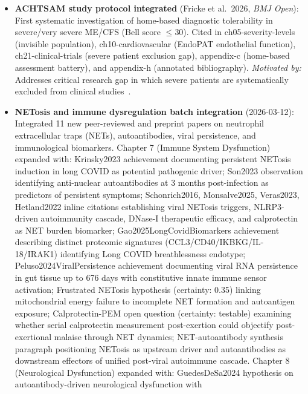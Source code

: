 \begin{itemize}

  \item \textbf{ACHTSAM study protocol integrated} (Fricke et al.\ 2026,
    \textit{BMJ Open}): First systematic investigation of home-based diagnostic
    tolerability in severe/very severe ME/CFS (Bell score $\leq$30). Cited in
    ch05-severity-levels (invisible population), ch10-cardiovascular (EndoPAT
    endothelial function), ch21-clinical-trials (severe patient exclusion gap),
    appendix-c (home-based assessment battery), and appendix-h (annotated
    bibliography).
    \textit{Motivated by:} Addresses critical research gap in which severe
    patients are systematically excluded from clinical
    studies~\cite{Fricke2026achtsam}.

  \item \textbf{NETosis and immune dysregulation batch integration} (2026-03-12):
    Integrated 11 new peer-reviewed and preprint papers on neutrophil extracellular
    traps (NETs), autoantibodies, viral persistence, and immunological biomarkers.
    Chapter 7 (Immune System Dysfunction) expanded with: Krinsky2023 achievement
    documenting persistent NETosis induction in long COVID as potential pathogenic
    driver; Son2023 observation identifying anti-nuclear autoantibodies at 3 months
    post-infection as predictors of persistent symptoms; Schonrich2016, Monsalve2025,
    Veras2023, Hetland2022 inline citations establishing viral NETosis triggers,
    NLRP3-driven autoimmunity cascade, DNase-I therapeutic efficacy, and calprotectin
    as NET burden biomarker; Gao2025LongCovidBiomarkers achievement describing
    distinct proteomic signatures (CCL3/CD40/IKBKG/IL-18/IRAK1) identifying Long COVID
    breathlessness endotype; Peluso2024ViralPersistence achievement documenting viral
    RNA persistence in gut tissue up to 676 days with constitutive innate immune
    sensor activation; Frustrated NETosis hypothesis (certainty: 0.35) linking
    mitochondrial energy failure to incomplete NET formation and autoantigen exposure;
    Calprotectin-PEM open question (certainty: testable) examining whether serial
    calprotectin measurement post-exertion could objectify post-exertional malaise
    through NET dynamics; NET-autoantibody synthesis paragraph positioning NETosis as
    upstream driver and autoantibodies as downstream effectors of unified post-viral
    autoimmune cascade. Chapter 8 (Neurological Dysfunction) expanded with:
    GuedesDeSa2024 hypothesis on autoantibody-driven neurological dysfunction with

\end{itemize}
